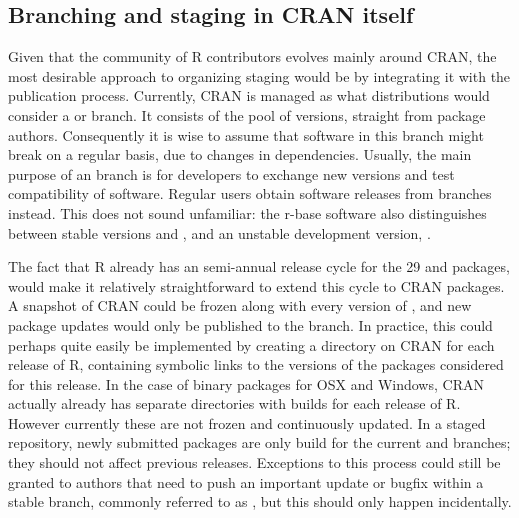 \subsection{Branching and staging in CRAN itself}

Given that the community of R contributors evolves mainly around CRAN, the most
desirable approach to organizing staging would be by integrating it with the
publication process. Currently, CRAN is managed as what distributions would
consider a  or  branch. It consists of the pool
of  versions, straight from package authors. Consequently it
is wise to assume that software in this branch might break on a regular
basis, due to changes in dependencies. Usually, the main purpose of an
 branch is for developers to exchange new versions and test
compatibility of software. Regular users obtain software releases from
 branches instead. This does not sound unfamiliar: the r-base
software also distinguishes between stable versions  and
, and an unstable development version, .

The fact that R already has an semi-annual release cycle for the 29 
and  packages, would make it relatively straightforward to
extend this cycle to CRAN packages. A snapshot of CRAN could be frozen along
with every version of , and new package updates would only be
published to the  branch. In practice, this could perhaps quite
easily be implemented by creating a directory on CRAN for each release of R,
containing symbolic links to the versions of the packages considered
 for this release. In the case of binary packages for OSX and
Windows, CRAN actually already has separate directories with builds for each
release of R. However currently these are not frozen and continuously updated.
In a staged repository, newly submitted packages are only build for the current
 and  branches; they should not affect previous
releases. Exceptions to this process could still be granted to authors that need
to push an important update or bugfix within a stable branch, commonly referred
to as , but this should only happen incidentally.

